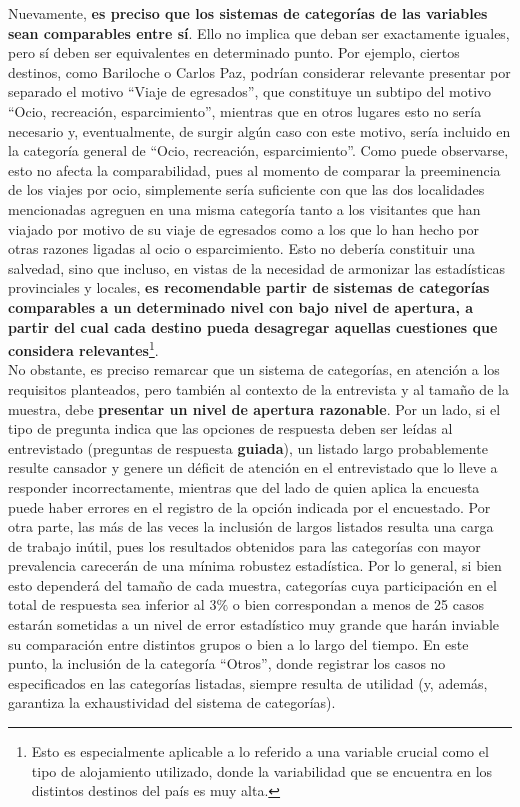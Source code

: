 \documentclass[
]{book}
\begin{document}
Nuevamente, \textbf{es preciso que los sistemas de categorías de las variables sean comparables entre sí}. Ello no implica que deban ser exactamente iguales, pero sí deben ser equivalentes en determinado punto. Por ejemplo, ciertos destinos, como Bariloche o Carlos Paz, podrían considerar relevante presentar por separado el motivo ``Viaje de egresados'', que constituye un subtipo del motivo ``Ocio, recreación, esparcimiento'', mientras que en otros lugares esto no sería necesario y, eventualmente, de surgir algún caso con este motivo, sería incluido en la categoría general de ``Ocio, recreación, esparcimiento''. Como puede observarse, esto no afecta la comparabilidad, pues al momento de comparar la preeminencia de los viajes por ocio, simplemente sería suficiente con que las dos localidades mencionadas agreguen en una misma categoría tanto a los visitantes que han viajado por motivo de su viaje de egresados como a los que lo han hecho por otras razones ligadas al ocio o esparcimiento. Esto no debería constituir una salvedad, sino que incluso, en vistas de la necesidad de armonizar las estadísticas provinciales y locales, \textbf{es recomendable partir de sistemas de categorías comparables a un determinado nivel con bajo nivel de apertura, a partir del cual cada destino pueda desagregar aquellas cuestiones que considera relevantes}\footnote{Esto es especialmente aplicable a lo referido a una variable crucial como el tipo de alojamiento utilizado, donde la variabilidad que se encuentra en los distintos destinos del país es muy alta.}.\\

No obstante, es preciso remarcar que un sistema de categorías, en atención a los requisitos planteados, pero también al contexto de la entrevista y al tamaño de la muestra, debe \textbf{presentar un nivel de apertura razonable}. Por un lado, si el tipo de pregunta indica que las opciones de respuesta deben ser leídas al entrevistado (preguntas de respuesta \textbf{guiada}), un listado largo probablemente resulte cansador y genere un déficit de atención en el entrevistado que lo lleve a responder incorrectamente, mientras que del lado de quien aplica la encuesta puede haber errores en el registro de la opción indicada por el encuestado. Por otra parte, las más de las veces la inclusión de largos listados resulta una carga de trabajo inútil, pues los resultados obtenidos para las categorías con mayor prevalencia carecerán de una mínima robustez estadística. Por lo general, si bien esto dependerá del tamaño de cada muestra, categorías cuya participación en el total de respuesta sea inferior al \(3\%\) o bien correspondan a menos de 25 casos estarán sometidas a un nivel de error estadístico muy grande que harán inviable su comparación entre distintos grupos o bien a lo largo del tiempo. En este punto, la inclusión de la categoría ``Otros'', donde registrar los casos no especificados en las categorías listadas, siempre resulta de utilidad (y, además, garantiza la exhaustividad del sistema de categorías).
\end{document}
